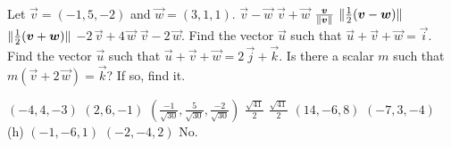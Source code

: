 
\begin{Exercise}[
name={},
title={}, 
difficulty=0,
origin={\cite{MC}}]
Let $\vec{v} = (-1,5,-2)$ and $\vec{w} = (3,1,1)$.
\Question $\vec{v} - \vec{w}$ 
\Question $\vec{v} + \vec{w}$
\Question $\frac{\bm{v}}{\lVert\bm{v}\rVert}$
\Question $\lVert\frac{1}{2}(\bm{v} - \bm{w})\rVert$
\Question $\lVert\frac{1}{2}(\bm{v} + \bm{w})\rVert$
\Question $-2\,\vec{v} +   4\,\vec{w}$
\Question $\vec{v} - 2\,\vec{w}$.
\Question Find the vector $\vec{u}$ such that $\vec{u} + \vec{v} + \vec{w} = \vec{i}$.
\Question Find the vector $\vec{u}$ such that $\vec{u} + \vec{v} + \vec{w} = 2\,\vec{j} + \vec{k}$.
\Question Is there a scalar $m$ such that $m(\vec{v} + 2\,\vec{w}) = \vec{k}$? If so, find it.
\end{Exercise}

\begin{Answer}
\Question $(-4,4,-3)$
\Question $(2,6,-1)$
\Question $\left ( \frac{-1}{\sqrt{30}},\frac{5}{\sqrt{30}},\frac{-2}{\sqrt{30}}\right )$
\Question $\frac{\sqrt{41}}{2}$
\Question $\frac{\sqrt{41}}{2}$
\Question $(14,-6,8)$
\Question $(-7,3,-4)$\\(h) $(-1,-6,1)$ 
\Question $(-2,-4,2)$
\Question No.
\end{Answer}
